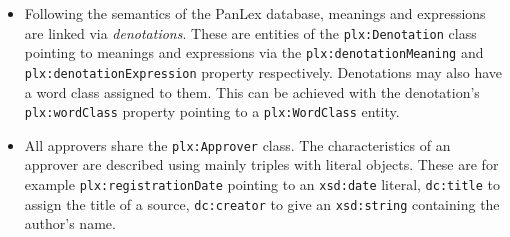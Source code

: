 \documentclass[sw]{iosart2c}
\begin{document}
\begin{itemize}
\item Following the semantics of the PanLex database, meanings and expressions are linked via \emph{denotations}.
These are entities of the \texttt{\small plx:Denotation} class pointing to meanings and expressions via the \texttt{\small plx:denotationMeaning} and \\ \texttt{\small plx:denotationExpression} property respectively. %
Denotations may also have a word class assigned to them.
This can be achieved with the denotation's \texttt{\small plx:wordClass} property pointing to a \texttt{\small plx:WordClass} entity.
\item All approvers share the \texttt{\small plx:Approver} class. The characteristics of an approver are described using mainly triples with literal objects.
These are for example \texttt{\small plx:registrationDate} pointing to an \texttt{\small xsd:date} literal,
\texttt{\small dc:title} to assign the title of a source,
\texttt{\small dc:creator} to give an \texttt{\small xsd:string} containing the author's name.
\end{itemize}





\end{document}

